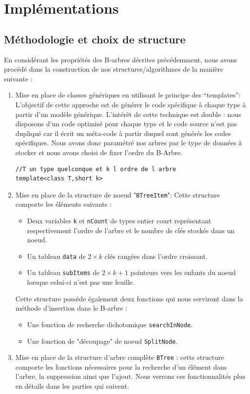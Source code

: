 \section{Implémentations}
\subsection{Méthodologie et choix de structure}
En considérant les propriétés des B-arbres décrites précédemment, nous avons procédé dans la construction de nos structures/algorithmes de la manière suivante : 
\begin{enumerate}
\item Mise en place de classes génériques en utilisant le principe des “templates”: L’objectif de cette approche est de générer le code spécifique à chaque type à partir d'un modèle générique. L’intérêt de cette technique est double : nous disposons d’un code optimisé pour chaque type et le code source n'est pas dupliqué car il écrit un méta-code à partir duquel sont générés les codes spécifiques. Nous avons donc paramétré nos arbres par le type de données à stocker et nous avons choisi de fixer l’ordre du B-Arbre.
\begin{lstlisting}
//T un type quelconque et k l ordre de l arbre
template<class T,short k>
\end{lstlisting}
\item     Mise en place de la structure de noeud "\verb+BTreeItem+": Cette structure comporte les éléments suivants :
\begin{itemize}
\item     Deux variables \verb+k+ et \verb+nCount+ de types entier court représentant respectivement l'ordre de l'arbre et le nombre de clés stockés dans un noeud.
\item     Un tableau \verb+data+ de $2 \times k$ clés rangées dans l'ordre croissant.
\item     Un tableau \verb+subItems+ de $2\times k+1$ pointeurs vers les enfants du noeud lorsque celui-ci n'est pas une feuille.
\end{itemize}
Cette structure possède également deux fonctions qui nous serviront dans la méthode d’insertion dans le B-arbre :
\begin{itemize}
\item     Une fonction de recherche dichotomique\cite{dichotomie} \verb+searchInNode+.
\item         Une fonction de "découpage" de noeud \verb+SplitNode+.   
\end{itemize}
\item     Mise en place de la structure d’arbre complète \verb+BTree+ : cette structure comporte les fonctions nécessaires pour la recherche d’un élément dans l’arbre, la suppression ainsi que l’ajout. Nous verrons ces fonctionnalités plus en détails dans les parties qui suivent.
\end{enumerate}

